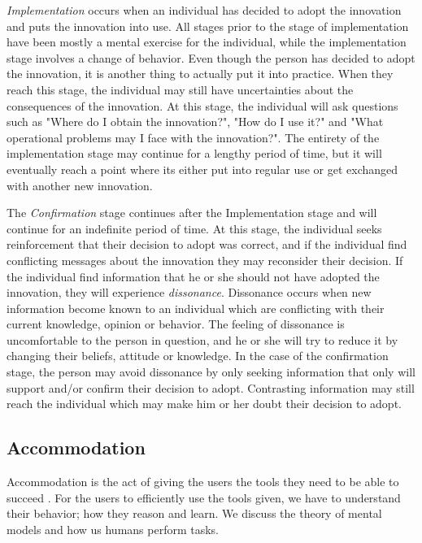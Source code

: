 \textit{Implementation} occurs when an individual has decided to adopt the innovation and puts the innovation into use. All stages prior to the stage of implementation have been mostly a mental exercise for the individual, while the implementation stage involves a change of behavior. Even though the person has decided to adopt the innovation, it is another thing to actually put it into practice. When they reach this stage, the individual may still have uncertainties about the consequences of the innovation. At this stage, the individual will ask questions such as "Where do I obtain the innovation?", "How do I use it?" and "What operational problems may I face with the innovation?". The entirety of the implementation stage may continue for a lengthy period of time, but it will eventually reach a point where its either put into regular use or get exchanged with another new innovation.

The \textit{Confirmation} stage continues after the Implementation stage and will continue for an indefinite period of time. At this stage, the individual seeks reinforcement that their decision to adopt was correct, and if the individual find conflicting messages about the innovation they may reconsider their decision. If the individual find information that he or she should not have adopted the innovation, they will experience \textit{dissonance}. Dissonance occurs when new information become known to an individual which are conflicting with their current knowledge, opinion or behavior. The feeling of dissonance is uncomfortable to the person in question, and he or she will try to reduce it by changing their beliefs, attitude or knowledge. In the case of the confirmation stage, the person may avoid dissonance by only seeking information that only will support and/or confirm their decision to adopt. Contrasting information may still reach the individual which may make him or her doubt their decision to adopt.

\subsection{Accommodation}
Accommodation is the act of giving the users the tools they need to be able to succeed \cite{Bradt2009}. For the users to efficiently use the tools given, we have to understand their behavior; how they reason and learn. We discuss the theory of mental models and how us humans perform tasks.

